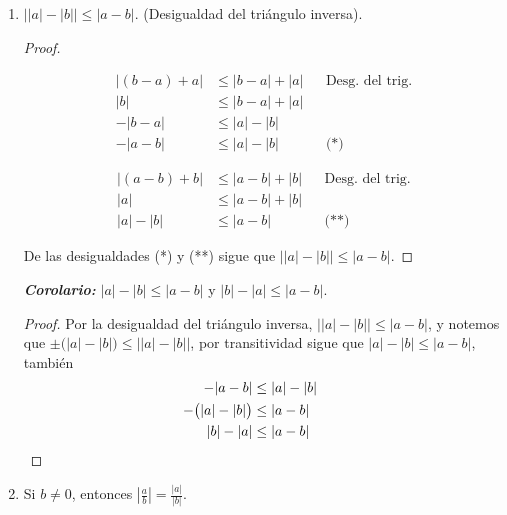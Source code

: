 \documentclass[11pt]{article}
\newcommand{\bfit}[1]{\textbf{\textit{#1}}}
\begin{document}
\begin{enumerate}[label=\alph*)]
 \item $\big| |a|-|b| \big| \leq |a-b|$. (Desigualdad del triángulo inversa).

 \begin{proof} \leavevmode
 \begin{center}\vspace{-2.5em}
 \begin{minipage}[t]{.5\linewidth}
 \begin{align*}
  |(b-a)+a| &\leq |b-a|+|a| && \text{Desg. del trig.} \\
  |b| &\leq |b-a|+|a| \\
  -|b-a| &\leq |a|-|b| \\
  -|a-b| &\leq |a|-|b| && \text{(*)}
 \end{align*}
 \end{minipage}%
 \begin{minipage}[t]{.5\linewidth}
 \begin{align*}
  |(a-b)+b| &\leq |a-b|+|b| && \text{Desg. del trig.} \\
  |a| &\leq |a-b|+|b| \\
  |a|-|b| &\leq |a-b| && \text{(**)}
 \end{align*}
 \end{minipage}
 \end{center}
 De las desigualdades (*) y (**) sigue que $\big| |a| - |b| \big| \leq |a-b|$.
 \end{proof}

 \bfit{Corolario:} $|a|-|b|\leq |a-b|$ y $|b|-|a|\leq |a-b|$.
 \begin{proof}
 Por la desigualdad del triángulo inversa, $\big| |a|-|b| \big| \leq |a-b|$, y notemos que $\pm \bigl(|a|-|b|\bigr)\leq \big| |a|-|b| \big|$, por transitividad sigue que $|a|-|b|\leq |a-b|$, también \begin{align*}
  -|a-b| &\leq |a|-|b|\\
  -\bigl(|a|-|b|\bigr) &\leq |a-b| \\
  |b|-|a| &\leq |a-b| && \qedhere
 \end{align*}
 \end{proof}

\item Si $b\neq 0$, entonces $\left| \frac{a}{b} \right| = \frac{|a|}{|b|}$.


\end{enumerate}
\end{document}
